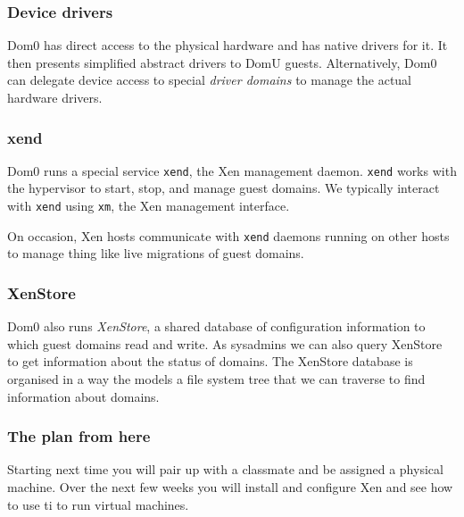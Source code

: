 \documentclass[10pt]{beamer}
\begin{document}
\begin{frame}
  \frametitle{Device drivers}
  
  Dom0 has direct access to the physical hardware and has native drivers for it. It then presents simplified abstract drivers to DomU guests. Alternatively, Dom0 can delegate device access to special \emph{driver domains} to manage the actual hardware drivers. 
  
  \vspace{5mm}
             
\end{frame}

\begin{frame}
  \frametitle{xend}
  
  Dom0 runs a special service \texttt{xend}, the Xen management daemon.  \texttt{xend} works with the hypervisor to start, stop, and manage guest domains. 
  We typically interact with \texttt{xend} using \texttt{xm}, the Xen management interface.         
  
  \vspace{5mm}
  
  On occasion, Xen hosts communicate with \texttt{xend} daemons running on other hosts to manage thing like live migrations of guest domains.   
\end{frame}

\begin{frame}
  \frametitle{XenStore}
  
  Dom0 also runs \emph{XenStore}, a shared database of configuration information to which guest domains read and write.  As sysadmins we can also 
  query XenStore to get information about the status of domains. The XenStore database is organised in a way the models a file system tree that we can traverse to 
  find information about domains.
\end{frame}

\begin{frame}
  \frametitle{The plan from here}
  
  Starting next time you will pair up with a classmate and be assigned a physical machine. Over the next few weeks you will install and configure Xen and see 
  how to use ti to run virtual machines.
  
\end{frame}
\end{document}

